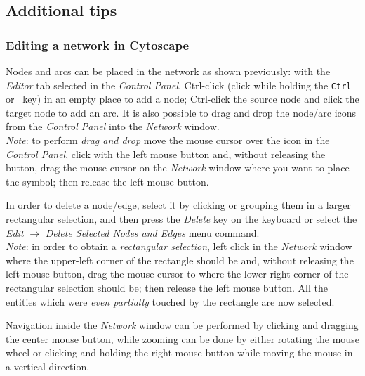 \subsection{Additional tips}
\subsubsection{Editing a network in Cytoscape}
Nodes and arcs can be placed in the network as shown previously: with the \emph{Editor} tab selected in the
\emph{Control Panel},
Ctrl-click (click while holding the {\tt Ctrl} or \maccmd\ key) in an empty place to add a node; Ctrl-click the source
node and click the target node to add an arc. It is also possible to drag and drop the node/arc icons from the \emph{Control Panel}
into the \emph{Network} window.\\
\emph{Note}: to perform \emph{drag and drop} move the mouse cursor over the icon in the \emph{Control Panel}, click with the left mouse
button and, without releasing the button, drag the mouse cursor on the \emph{Network} window where you want to
place the symbol; then release the left mouse button.

In order to delete a node/edge, select it by clicking
or grouping them in a larger rectangular selection, and then press the \emph{Delete} key on the keyboard
or select the \emph{Edit} $\rightarrow$ \emph{Delete Selected Nodes and Edges} menu command.\\
\emph{Note}: in order to obtain a \emph{rectangular selection}\label{nota:rectangular-selection},
left click in the \emph{Network} window where the upper-left corner of the rectangle should be and,
without releasing the left mouse button, drag the mouse cursor to where the lower-right corner of the
rectangular selection should be; then release the left mouse button. All the entities which were
\emph{even partially} touched by the rectangle are now selected.

Navigation inside the \emph{Network} window can be performed by clicking and dragging the center mouse button,
while zooming can be done by either rotating the mouse wheel or clicking and holding the right mouse button
while moving the mouse in a vertical direction.

